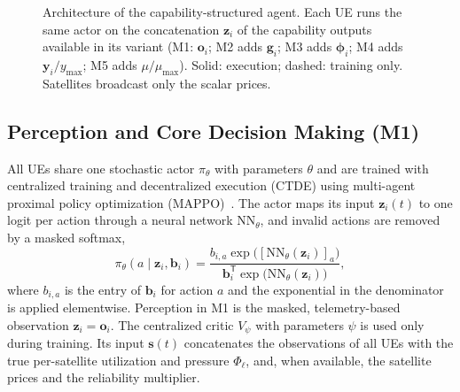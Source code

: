 \documentclass[journal]{IEEEtran}
\begin{document}
\begin{figure}[t]
{%
}
\caption{Architecture of the capability-structured agent. Each UE runs the
same actor on the concatenation $\mathbf{z}_i$ of the capability outputs
available in its variant (M1: $\mathbf{o}_i$; M2 adds $\mathbf{g}_i$; M3 adds
$\boldsymbol\phi_i$; M4 adds $\mathbf{y}_i/y_{\max}$; M5 adds $\mu/\mu_{\max}$).
Solid: execution; dashed: training only. Satellites broadcast only the scalar
prices.}
\label{fig:arch}
\end{figure}

\subsection{Perception and Core Decision Making (M1)}

All UEs share one stochastic actor $\pi_\theta$ with parameters $\theta$ and
are trained with centralized training and decentralized execution (CTDE)
using multi-agent proximal policy optimization (MAPPO)~\cite{yu2022mappo}. The
actor maps its input $\mathbf{z}_i(t)$ to one logit per action through a
neural network $\mathrm{NN}_\theta$, and invalid actions are removed by a
masked softmax,
\begin{equation}
\pi_\theta(a\mid\mathbf{z}_i,\mathbf{b}_i)=\frac{b_{i,a}\exp\big([\mathrm{NN}_\theta(\mathbf{z}_i)]_a\big)}{\mathbf{b}_i^{\mathsf T}\exp\big(\mathrm{NN}_\theta(\mathbf{z}_i)\big)},
\end{equation}
where $b_{i,a}$ is the entry of $\mathbf{b}_i$ for action $a$ and the
exponential in the denominator is applied elementwise. Perception in M1 is
the masked, telemetry-based observation $\mathbf{z}_i=\mathbf{o}_i$. The
centralized critic $V_\psi$ with parameters $\psi$ is used only during
training. Its input $\mathbf{s}(t)$ concatenates the observations of all UEs
with the true per-satellite utilization and pressure $\Phi_\ell$, and, when
available, the satellite prices and the reliability multiplier.
\end{document}
